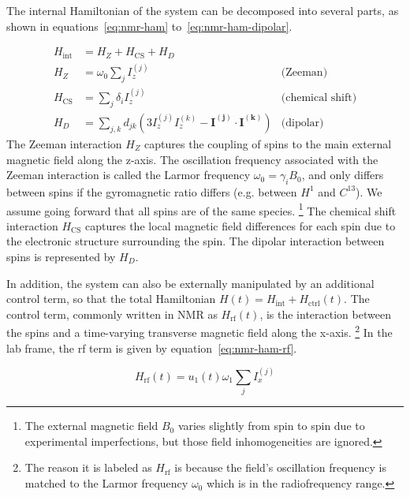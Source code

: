 The internal Hamiltonian of the system can be decomposed into several parts, as shown in equations~\ref{eq:nmr-ham} to~\ref{eq:nmr-ham-dipolar}.

\begin{align}\label{eq:nmr-ham}
    H_{\text{int}} &= H_Z + H_\text{CS} + H_D \\
    H_Z &= \omega_0 \sum_j I_z^{(j)} & \text{(Zeeman)} \\
    H_\text{CS} &= \sum_j \delta_i I_z^{(j)} & \text{(chemical shift)} \\
    \label{eq:nmr-ham-dipolar}
    H_D &= \sum_{j,k} d_{jk} \left( 3I_z^{(j)}I_z^{(k)} - \mathbf{I^{(j)}} \cdot \mathbf{I^{(k)}} \right)& \text{(dipolar)}
\end{align}
The Zeeman interaction $H_Z$ captures the coupling of spins to the main external magnetic field along the z-axis. The oscillation frequency associated with the Zeeman interaction is called the Larmor frequency $\omega_0 = \gamma_i B_0$, and only differs between spins if the gyromagnetic ratio differs (e.g. between $H^1$ and $C^{13}$). We assume going forward that all spins are of the same species.%
\footnote{The external magnetic field $B_0$ varies slightly from spin to spin due to experimental imperfections, but those field inhomogeneities are ignored.}
The chemical shift interaction $H_{\text{CS}}$ captures the local magnetic field differences for each spin due to the electronic structure surrounding the spin. The dipolar interaction between spins is represented by $H_D$.


In addition, the system can also be externally manipulated by an additional control term, so that the total Hamiltonian $H(t) = H_{\text{int}} + H_\text{ctrl}(t)$.
The control term, commonly written in NMR as $H_\text{rf}(t)$, is the interaction between the spins and a time-varying transverse magnetic field along the x-axis.%
\footnote{The reason it is labeled as $H_\text{rf}$ is because the field's oscillation frequency is matched to the Larmor frequency $\omega_0$ which is in the radiofrequency range.}
In the lab frame, the rf term is given by equation~\ref{eq:nmr-ham-rf}.

\begin{equation}
    \label{eq:nmr-ham-rf}
    H_{\text{rf}}(t) =  u_1(t) \omega_1 \sum_j I_x^{(j)}
\end{equation}


